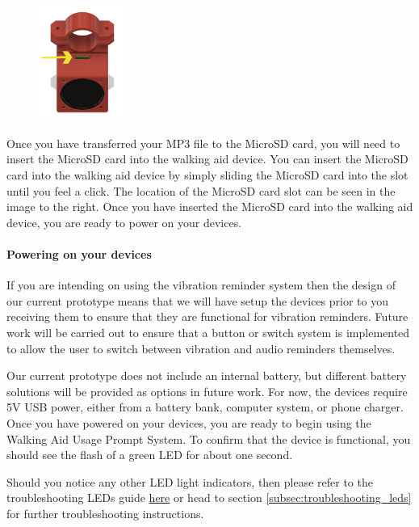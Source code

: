 				\begin{figure}
					\vspace{-3.5em}
					\centering
					\includegraphics[width=0.25\textwidth]{graphics/sd_arrow.png}
				\end{figure}

				Once you have transferred your MP3 file to the MicroSD card, you will need to insert the MicroSD card into the walking aid device. You can insert the MicroSD card into the walking aid device by simply sliding the MicroSD card into the slot until you feel a click. The location of the MicroSD card slot can be seen in the image to the right. Once you have inserted the MicroSD card into the walking aid device, you are ready to power on your devices.

				\paragraph{Powering on your devices}\mbox{}
				\label{para:powering}

				If you are intending on using the vibration reminder system then the design of our current prototype means that we will have setup the devices prior to you receiving them to ensure that they are functional for vibration reminders. Future work will be carried out to ensure that a button or switch system is implemented to allow the user to switch between vibration and audio reminders themselves.

				Our current prototype does not include an internal battery, but different battery solutions will be provided as options in future work. For now, the devices require 5V USB power, either from a battery bank, computer system, or phone charger. Once you have powered on your devices, you are ready to begin using the Walking Aid Usage Prompt System. To confirm that the device is functional, you should see the flash of a green LED for about one second.

				Should you notice any other LED light indicators, then please refer to the troubleshooting LEDs guide \hyperref[subsec:troubleshooting_leds]{here} or head to section \ref{subsec:troubleshooting_leds} for further troubleshooting instructions.

